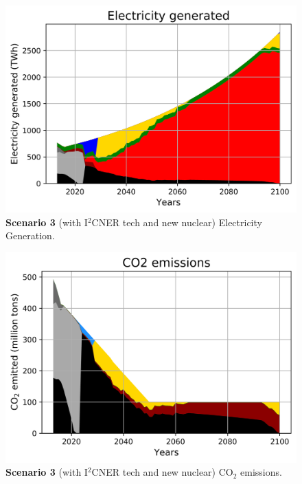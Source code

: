 \documentclass[final]{beamer}
\newlength{\onecolwid}
\newlength{\twocolwid}
\newlength{\threecolwid}
\begin{document}
\begin{frame}[t]
\begin{columns}[t,totalwidth=\threecolwid]
\begin{column}{\twocolwid}
\begin{columns}[t,totalwidth=\twocolwid]
\begin{column}{\onecolwid}
\begin{figure}[H] 
\centering
\includegraphics[scale=1.2]{i2cner_nuc_elc}
\caption{\textbf{Scenario 3} (with I$^2$CNER tech and new nuclear) Electricity Generation.}
\label{s3e}
\end{figure}

\begin{figure}[H] 
\centering
\includegraphics[scale=1.2]{i2cner_nuc_co2}
\caption{\textbf{Scenario 3} (with I$^2$CNER tech and new nuclear) CO$_2$ emissions.}
\label{s3c}
\end{figure}



\end{column}
\end{columns}
\end{column}
\end{columns}
\end{frame}
\end{document}
